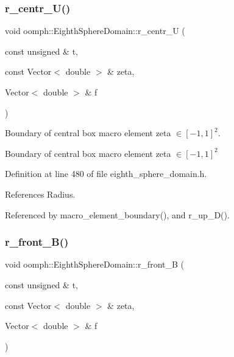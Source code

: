 \subsubsection{\texorpdfstring{r\+\_\+centr\+\_\+\+U()}{r\_centr\_U()}}
{\footnotesize\ttfamily void oomph\+::\+Eighth\+Sphere\+Domain\+::r\+\_\+centr\+\_\+U (\begin{DoxyParamCaption}\item[{const unsigned \&}]{t,  }\item[{const Vector$<$ double $>$ \&}]{zeta,  }\item[{Vector$<$ double $>$ \&}]{f }\end{DoxyParamCaption})\hspace{0.3cm}{\ttfamily [private]}}



Boundary of central box macro element zeta $ \in [-1,1]^2 $. 

Boundary of central box macro element zeta $ \in [-1,1]^2 $ 

Definition at line 480 of file eighth\+\_\+sphere\+\_\+domain.\+h.



References Radius.



Referenced by macro\+\_\+element\+\_\+boundary(), and r\+\_\+up\+\_\+\+D().

\mbox{\label{classoomph_1_1EighthSphereDomain_aa62bb16a2963530246c8cc9ef905c944}} 
\subsubsection{\texorpdfstring{r\+\_\+front\+\_\+\+B()}{r\_front\_B()}}
{\footnotesize\ttfamily void oomph\+::\+Eighth\+Sphere\+Domain\+::r\+\_\+front\+\_\+B (\begin{DoxyParamCaption}\item[{const unsigned \&}]{t,  }\item[{const Vector$<$ double $>$ \&}]{zeta,  }\item[{Vector$<$ double $>$ \&}]{f }\end{DoxyParamCaption})\hspace{0.3cm}{\ttfamily [private]}}



